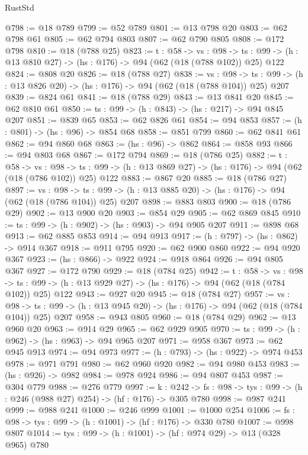 \begin{lexlean}{RustStd}
\begin{coremodule}
{\begin{coremodule}
{{{{{{{{{@798 := @18 @789
@799 := @52 @789
@801 := @13 @798 @20
@803 := @62 @798 @61
@805 := @62 @794 @803
@807 := @62 @790 @805
@808 := @172 @798
@810 := @18 (@788 @25)
@823 := {t : @58} ->
  {vs : @98} ->
  {ts : @99} -> (h : @13 @810 @27) -> (hs : @176) -> @94 (@62 (@18 (@788 @102)) @25) @122
@824 := @808 @20
@826 := @18 (@788 @27)
@838 := {vs : @98} ->
  {ts : @99} -> (h : @13 @826 @20) -> (hs : @176) -> @94 (@62 (@18 (@788 @104)) @25) @207
@839 := @824 @61
@841 := @18 (@788 @29)
@843 := @13 @841 @20
@845 := @62 @810 @61
@850 := {ts : @99} -> (h : @843) -> (hs : @217) -> @94 @845 @207
@851 := @839 @65
@853 := @62 @826 @61
@854 := @94 @853
@857 := (h : @801) -> (hs : @96) -> @854 @68
@858 := @851 @799
@860 := @62 @841 @61
@862 := @94 @860 @68
@863 := (hs : @96) -> @862
@864 := @858 @93
@866 := @94 @803 @68
@867 := @172 @794
@869 := @18 (@786 @25)
@882 := {t : @58} ->
  {vs : @98} ->
  {ts : @99} -> (h : @13 @869 @27) -> (hs : @176) -> @94 (@62 (@18 (@786 @102)) @25) @122
@883 := @867 @20
@885 := @18 (@786 @27)
@897 := {vs : @98} ->
  {ts : @99} -> (h : @13 @885 @20) -> (hs : @176) -> @94 (@62 (@18 (@786 @104)) @25) @207
@898 := @883 @803
@900 := @18 (@786 @29)
@902 := @13 @900 @20
@903 := @854 @29
@905 := @62 @869 @845
@910 := {ts : @99} -> (h : @902) -> (hs : @903) -> @94 @905 @207
@911 := @898 @68
@913 := @62 @885 @853
@914 := @94 @913
@917 := (h : @797) -> (hs : @862) -> @914 @367
@918 := @911 @795
@920 := @62 @900 @860
@922 := @94 @920 @367
@923 := (hs : @866) -> @922
@924 := @918 @864
@926 := @94 @805 @367
@927 := @172 @790
@929 := @18 (@784 @25)
@942 := {t : @58} ->
  {vs : @98} ->
  {ts : @99} -> (h : @13 @929 @27) -> (hs : @176) -> @94 (@62 (@18 (@784 @102)) @25) @122
@943 := @927 @20
@945 := @18 (@784 @27)
@957 := {vs : @98} ->
  {ts : @99} -> (h : @13 @945 @20) -> (hs : @176) -> @94 (@62 (@18 (@784 @104)) @25) @207
@958 := @943 @805
@960 := @18 (@784 @29)
@962 := @13 @960 @20
@963 := @914 @29
@965 := @62 @929 @905
@970 := {ts : @99} -> (h : @962) -> (hs : @963) -> @94 @965 @207
@971 := @958 @367
@973 := @62 @945 @913
@974 := @94 @973
@977 := (h : @793) -> (hs : @922) -> @974 @453
@978 := @971 @791
@980 := @62 @960 @920
@982 := @94 @980 @453
@983 := (hs : @926) -> @982
@984 := @978 @924
@986 := @94 @807 @453
@987 := @304 @779
@988 := @276 @779
@997 := {k : @242} ->
  {fs : @98} -> {tys : @99} -> (h : @246 (@988 @27) @254) -> (hf : @176) -> @305 @780
@998 := @987 @241
@999 := @988 @241
@1000 := @246 @999
@1001 := @1000 @254
@1006 := {fs : @98} -> {tys : @99} -> (h : @1001) -> (hf : @176) -> @330 @780
@1007 := @998 @807
@1014 := {tys : @99} -> (h : @1001) -> (hf : @974 @29) -> @13 (@328 @965) @780
}}}}}}}}}
\end{coremodule}}
\end{coremodule}
\end{lexlean}
